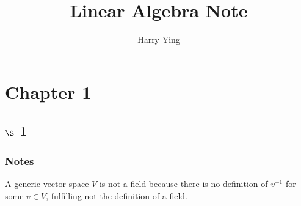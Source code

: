\documentclass[11pt]{article}
\author{Harry Ying}
\date{}
\title{Linear Algebra Note}
\begin{document}
\maketitle
\tableofcontents \clearpage
\section{Chapter 1}
\label{sec:orgf1e920f}
\subsection{\(\S\) 1}
\label{sec:orge6ee825}
\subsubsection{Notes}
\label{sec:org2eaf95e}
A generic vector space \(V\) is not a field because there is no definition of \(v^{-1}\) for some \(v\in V\), fulfilling not the definition of a field.\\
\end{document}
